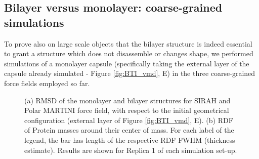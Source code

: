 \subsection{Bilayer versus monolayer: coarse-grained simulations}
To prove also on large scale objects that the bilayer structure is indeed essential to grant a structure which does not disassemble or changes shape, we performed simulations of a monolayer capsule (specifically taking the external layer of the capsule already simulated - Figure \ref{fig:BTI_vmd}, E) in the three coarse-grained force fields employed so far.
%
\begin{figure}[h!]
    \caption[Comparison of monolayer and bilayer structural properties]{(a) RMSD of the monolayer and bilayer structures for SIRAH and Polar MARTINI force field, with respect to the initial geometrical configuration (external layer of Figure \ref{fig:BTI_vmd}, E). (b) RDF of Protein masses around their center of mass. For each label of the legend, the bar has length of the respective RDF FWHM (thickness estimate). Results are shown for Replica 1 of each simulation set-up.}
\label{fig:mono_bi}
\end{figure}

